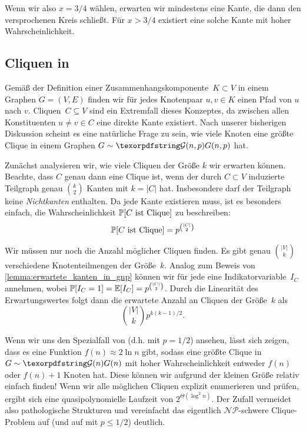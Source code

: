 Wenn wir also $x = 3/4$ wählen, erwarten wir mindestens eine Kante, die dann den versprochenen Kreis schließt.
Für $x > 3/4$ existiert eine solche Kante mit hoher Wahrscheinlichkeit.

\subsection{Cliquen in \Gnp}
Gemäß der Definition einer Zusammenhangskomponente~$K \subset V$ in einem Graphen $G=(V,E)$ finden wir für jedes Knotenpaar $u, v \in K$ einen Pfad von $u$ nach $v$.
Cliquen~$C \subseteq V$ sind ein Extremfall dieses Konzeptes, da zwischen allen Konstituenten $u \ne v \in C$ eine direkte Kante existiert.
Nach unserer bisherigen Diskussion scheint es eine natürliche Frage zu sein, wie viele Knoten eine größte Clique in einem Graphen $G \sim \Gnp$ hat.

Zunächst analysieren wir, wie viele Cliquen der Größe $k$ wir erwarten können.
Beachte, dass $C$ genau dann eine Clique ist, wenn der durch $C \subset V$ induzierte Teilgraph genau $\binom{k}{2}$ Kanten mit $k = |C|$ hat.
Insbesondere darf der Teilgraph keine \emph{Nichtkanten} enthalten.
Da jede Kante existieren muss, ist es besonders einfach, die Wahrscheinlichkeit $\mathbb{P}\!\left[\text{$C$ ist Clique}\right]$ zu beschreiben:
\begin{equation}
    \mathbb{P}\!\left[\text{$C$ ist Clique}\right] = p^{\binom{|C|}{2}}
\end{equation}

Wir müssen nur noch die Anzahl möglicher Cliquen finden.
Es gibt genau $\binom{|V|}{k}$ verschiedene Knotenteilmengen der Größe~$k$.
Analog zum Beweis von \cref{lemma:erwartete_kanten_in_gnp} können wir für jede eine Indikatorvariable~$I_C$ annehmen, wobei $\mathbb{P}\!\left[I_C = 1\right] = \mathbb{E}\!\left[I_C\right] = p^{\smash{\binom{|C|}{2}}}$.
Durch die Linearität des Erwartungswertes folgt dann die erwartete Anzahl an Cliquen der Größe~$k$ als
\begin{equation}
    \binom{|V|}{k} p^{k(k-1)/2}.
\end{equation}

Wenn wir uns den Spezialfall von \Gn (d.h. \Gnp mit $p = 1/2$) ansehen, lässt sich zeigen, dass es eine Funktion $f(n) \approx 2\ln n$ gibt,
sodass eine größte Clique in $G \sim \Gn$ mit hoher Wahrscheinlichkeit entweder $f(n)$ oder $f(n)+1$ Knoten hat.
Diese können wir aufgrund der kleinen Größe relativ einfach finden!
Wenn wir alle möglichen Cliquen explizit enumerieren und prüfen, ergibt sich  eine quasipolynomielle Laufzeit von $2^{\Theta(\log^2 n)}$.
Der Zufall vermeidet also pathologische Strukturen und vereinfacht das eigentlich $\mathcal{NP}$-schwere Clique-Problem auf \Gn (und auf \Gnp mit $p \le 1/2$) deutlich.
